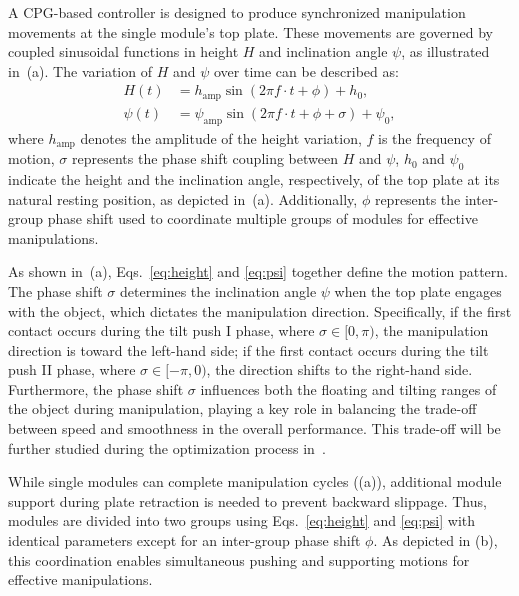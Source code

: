 A CPG-based controller is designed to produce synchronized manipulation movements at the single module's top plate. These movements are governed by coupled sinusoidal functions in height $H$ and inclination angle $\psi$, as illustrated in~(a). The variation of $H$ and $\psi$ over time can be described as:
\begin{align}
    H(t) &= h_\text{amp} \sin(2\pi f \cdot t + \phi) + h_0\label{eq:height}, \\
    \psi(t) &= \psi_\text{amp} \sin(2\pi f \cdot t + \phi+ \sigma) + \psi_0\label{eq:psi},
\end{align}
where $h_\text{amp}$ denotes the amplitude of the height variation, $f$ is the frequency of motion, $\sigma$ represents the phase shift coupling between $H$ and $\psi$, $h_0$ and $\psi_0$ indicate the height and the inclination angle, respectively, of the top plate at its natural resting position, as depicted in~(a). Additionally, $\phi$ represents the inter-group phase shift used to coordinate multiple groups of modules for effective manipulations.

As shown in~(a), Eqs.~\eqref{eq:height} and \eqref{eq:psi} together define the motion pattern. The phase shift $\sigma$ determines the inclination angle $\psi$ when the top plate engages with the object, which dictates the manipulation direction. Specifically, if the first contact occurs during the tilt push I phase, where $\sigma \in [0, \pi)$, the manipulation direction is toward the left-hand side; if the first contact occurs during the tilt push II phase, where $\sigma \in [-\pi, 0)$, the direction shifts to the right-hand side. Furthermore, the phase shift $\sigma$ influences both the floating and tilting ranges of the object during manipulation, playing a key role in balancing the trade-off between speed and smoothness in the overall performance. This trade-off will be further studied during the optimization process in~.

While single modules can complete manipulation cycles ((a)), additional module support during plate retraction is needed to prevent backward slippage. Thus, modules are divided into two groups using Eqs.~\eqref{eq:height} and \eqref{eq:psi} with identical parameters except for an inter-group phase shift $\phi$. As depicted in (b), this coordination enables simultaneous pushing and supporting motions for effective manipulations.


